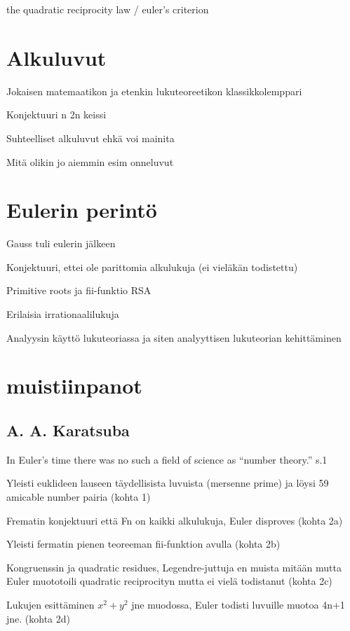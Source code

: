 \documentclass[a4paper,11pt]{article}
\begin{document}
the quadratic reciprocity law / euler's criterion

\section{Alkuluvut}

Jokaisen matemaatikon ja etenkin lukuteoreetikon klassikkolemppari

Konjektuuri n 2n keissi

Suhteelliset alkuluvut ehkä voi mainita

Mitä olikin jo aiemmin esim onneluvut

\section{Eulerin perintö}

Gauss tuli eulerin jälkeen

Konjektuuri, ettei ole parittomia alkulukuja (ei vieläkän todistettu)

Primitive roots ja fii-funktio RSA

Erilaisia irrationaalilukuja

Analyysin käyttö lukuteoriassa ja siten analyyttisen lukuteorian kehittäminen



\section{muistiinpanot}

\subsection{A. A. Karatsuba}

In Euler’s time there was no such a field of science as “number theory.” s.1

Yleisti euklideen lauseen täydellisista luvuista (mersenne prime) ja löysi 59 amicable number pairia (kohta 1)

Frematin konjektuuri että Fn on kaikki alkulukuja, Euler disproves (kohta 2a)

Yleisti fermatin pienen teoreeman fii-funktion avulla (kohta 2b)

Kongruenssin ja quadratic residues, Legendre-juttuja en muista mitään mutta Euler muototoili quadratic reciprocityn mutta ei vielä todistanut (kohta 2c)

Lukujen esittäminen $x^2+y^2$ jne muodossa, Euler todisti luvuille muotoa 4n+1 jne. (kohta 2d)
\end{document}
